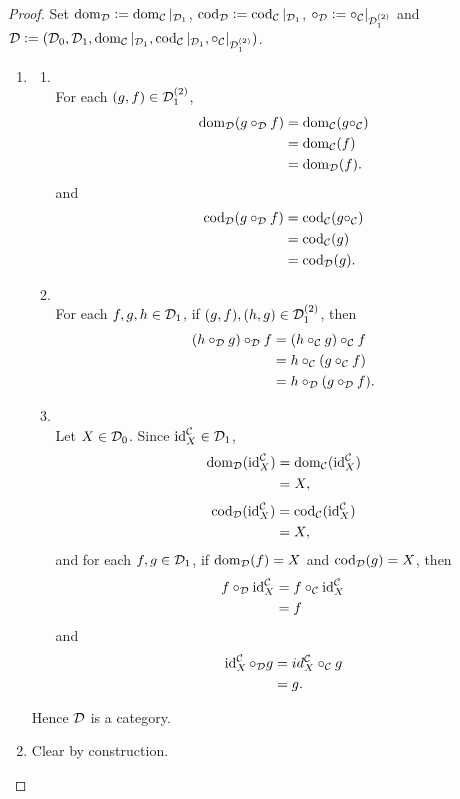 \documentclass{book}
\begin{document}
	\begin{proof}
		Set $\dom_{\MD} \defeq \dom_{\MC}|_{\MD_1}$, $\cod_{\MD} \defeq \cod_{\MC}|_{\MD_1}$, $\circ_{\MD} \defeq \circ_{\MC}|_{\MD_1^{(2)}}$ and $\MD \defeq (\MD_0, \MD_1, \dom_{\MC}|_{\MD_1}, \cod_{\MC}|_{\MD_1}, \circ_{\MC}|_{\MD_1^{(2)}})$.
		\begin{enumerate}
			\item 
			\begin{enumerate}
				\item {} \\
				For each $(g,f) \in \MD_1^{(2)}$, 
				\begin{align*}
					\dom_{\MD}(g \circ_{\MD} f)
					& = \dom_{\MC}(g \circ_{\MC}) \\
					& = \dom_{\MC}(f) \\
					& = \dom_{\MD}(f).
				\end{align*}
				and 
				\begin{align*}
					\cod_{\MD}(g \circ_{\MD} f)
					& = \cod_{\MC}(g \circ_{\MC}) \\
					& = \cod_{\MC}(g) \\
					& = \cod_{\MD}(g).
				\end{align*}
				\item {} \\
				For each $f,g,h \in \MD_1$, if $(g,f), (h,g) \in \MD_1^{(2)}$, then 
				\begin{align*}
					(h \circ_{\MD} g) \circ_{\MD} f 
					& = (h \circ_{\MC} g) \circ_{\MC} f \\
					& = h \circ_{\MC} (g \circ_{\MC} f) \\
					& = h \circ_{\MD} (g \circ_{\MD} f).
				\end{align*}  
				\item {} \\
				Let $X \in \MD_0$. Since $\id_X^{\MC} \in \MD_1$,  
				\begin{align*}
					\dom_{\MD}(\id_X^{\MC}) 
					& = \dom_{\MC}(\id_X^{\MC}) \\
					& = X,
				\end{align*}
				\begin{align*}
					\cod_{\MD}(\id_X^{\MC}) 
					& = \cod_{\MC}(\id_X^{\MC}) \\ 
					& = X,
				\end{align*}
				and for each $f, g \in \MD_1$, if $\dom_{\MD}(f) = X$ and $\cod_{\MD}(g) = X$, then 
				\begin{align*}
					f \circ_{\MD} \id_X^{\MC}
					& = f \circ_{\MC} \id_X^{\MC} \\
					& = f
				\end{align*}
				and 
				\begin{align*}
					\id_X^{\MC} \circ_{\MD} g 
					& = id_X^{\MC} \circ_{\MC} g \\
					& = g.
				\end{align*} 
			\end{enumerate}
			Hence $\MD$ is a category.
			\item Clear by construction.
		\end{enumerate}
	\end{proof}
	
\end{document}
